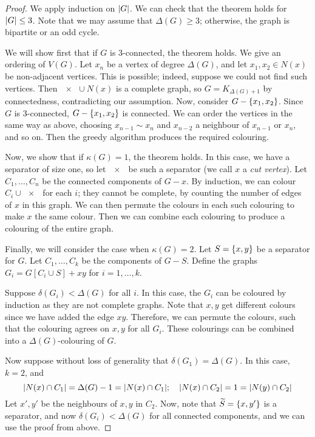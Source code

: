 \begin{proof}
	We apply induction on \( \abs{G} \).
	We can check that the theorem holds for \( \abs{G} \leq 3 \).
	Note that we may assume that \( \Delta(G) \geq 3 \); otherwise, the graph is bipartite or an odd cycle.

	We will show first that if \( G \) is 3-connected, the theorem holds.
	We give an ordering of \( V(G) \).
	Let \( x_n \) be a vertex of degree \( \Delta(G) \), and let \( x_1, x_2 \in N(x) \) be non-adjacent vertices.
	This is possible; indeed, suppose we could not find such vertices.
	Then \( \qty{x} \cup N(x) \) is a complete graph, so \( G = K_{\Delta(G) + 1} \) by connectedness, contradicting our assumption.
	Now, consider \( G - \qty{x_1, x_2} \).
	Since \( G \) is 3-connected, \( G - \qty{x_1,x_2} \) is connected.
	We can order the vertices in the same way as above, choosing \( x_{n-1} \sim x_n \) and \( x_{n-2} \) a neighbour of \( x_{n-1} \) or \( x_n \), and so on.
	Then the greedy algorithm produces the required colouring.

	Now, we show that if \( \kappa(G) = 1 \), the theorem holds.
	In this case, we have a separator of size one, so let \( \qty{x} \) be such a separator (we call \( x \) a \emph{cut vertex}).
	Let \( C_1, \dots, C_n \) be the connected components of \( G - x \).
	By induction, we can colour \( C_i \cup \qty{x} \) for each \( i \); they cannot be complete, by counting the number of edges of \( x \) in this graph.
	We can then permute the colours in each such colouring to make \( x \) the same colour.
	Then we can combine each colouring to produce a colouring of the entire graph.

	Finally, we will consider the case when \( \kappa(G) = 2 \).
	Let \( S = \qty{x,y} \) be a separator for \( G \).
	Let \( C_1, \dots, C_k \) be the components of \( G - S \).
	Define the graphs \( G_i = G[C_i \cup S] + xy \) for \( i = 1, \dots, k \).

	Suppose \( \delta(G_i) < \Delta(G) \) for all \( i \).
	In this case, the \( G_i \) can be coloured by induction as they are not complete graphs.
	Note that \( x, y \) get different colours since we have added the edge \( xy \).
	Therefore, we can permute the colours, such that the colouring agrees on \( x,y \) for all \( G_i \).
	These colourings can be combined into a \( \Delta(G) \)-colouring of \( G \).

	Now suppose without loss of generality that \( \delta(G_1) = \Delta(G) \).
	In this case, \( k = 2 \), and
	\[ \abs{N(x) \cap C_1} = \Delta(G) - 1 = \abs{N(x) \cap C_1};\quad \abs{N(x) \cap C_2} = 1 = \abs{N(y) \cap C_2} \]
	Let \( x', y' \) be the neighbours of \( x, y \) in \( C_2 \).
	Now, note that \( \widetilde S = \qty{x,y'} \) is a separator, and now \( \delta(G_i) < \Delta(G) \) for all connected components, and we can use the proof from above.
\end{proof}

